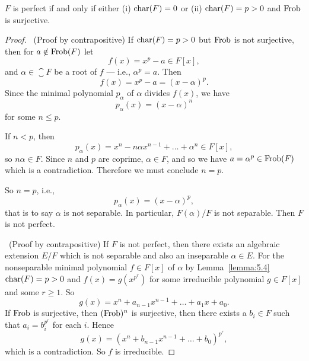 \begin{proposition}\label{prop:5.5}
$F$ is perfect if and only if either (i) $\operatorname{char}(F)=0$ or (ii) $\operatorname{char}(F)=p>0$
  and $\operatorname{Frob}$ is surjective.
\end{proposition}

\begin{proof}
\forwardproof\ (Proof by contrapositive)
If $\operatorname{char}(F)=p>0$ but $\operatorname{Frob}$ is not surjective, then
for $a\notin\operatorname{Frob}(F)$ let
\begin{equation}
f(x)=x^{p}-a\in F[x],
\end{equation}
and $\alpha\in\closure{F}$ be a root of $f$ --- i.e., $\alpha^{p}=a$.
Then
\begin{equation}
f(x)=x^{p}-a=(x-\alpha)^{p}.
\end{equation}
Since the minimal polynomial $p_{\alpha}$ of $\alpha$ divides $f(x)$,
we have
\begin{equation}
p_{\alpha}(x)=(x-\alpha)^{n}
\end{equation}
for some $n\leq p$.

If $n<p$, then
\begin{equation}
p_{\alpha}(x)=x^{n}-n\alpha x^{n-1}+\dots+\alpha^{n}\in F[x],
\end{equation}
so $n\alpha\in F$. Since $n$ and $p$ are coprime, $\alpha\in F$, and
so we have $a=\alpha^{p}\in\operatorname{Frob}(F)$ which is a
contradiction. Therefore we must conclude $n=p$.

So $n=p$, i.e.,
\begin{equation}
p_{\alpha}(x)=(x-\alpha)^{p},
\end{equation}
that is to say $\alpha$ is not separable. In particular, $F(\alpha)/F$
is not separable. Then $F$ is not perfect.

\backwardproof\ (Proof by contrapositive)
If $F$ is not perfect, then there exists an algebraic extension $E/F$
which is not separable and also an inseparable $\alpha\in E$. For the
nonseparable minimal polynomial $f\in F[x]$ of $\alpha$ by Lemma~\ref{lemma:5.4}
$\operatorname{char}(F)=p>0$ and $f(x)=g(x^{p^{r}})$ for some irreducible polynomial
$g\in F[x]$ and some $r\geq1$. So
\begin{equation}
g(x)=x^{n}+a_{n-1}x^{n-1}+\dots+a_{1}x+a_{0}.
\end{equation}
If $\operatorname{Frob}$ is surjective, then $(\operatorname{Frob})^{n}$ is surjective, then there
exists a $b_{i}\in F$ such that $a_{i}=b_{i}^{p^{r}}$ for each $i$. Hence
\begin{equation}
g(x)=(x^{n}+b_{n-1}x^{n-1}+\dots+b_{0})^{p^{r}},
\end{equation}
which is a contradiction. So $f$ is irreducible.
\end{proof}